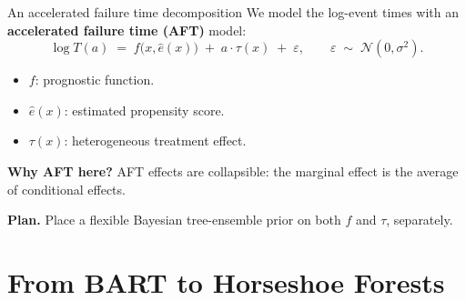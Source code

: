 \documentclass[10pt,aspectratio=169]{beamer}
\newcommand{\N}{\mathcal{N}}
\begin{document}
\begin{frame}{An accelerated failure time decomposition}
We model the log-event times with an \textbf{accelerated failure time (AFT)} model:
\[
\log T(a) \;=\; f\bigl(x, \hat e(x)\bigr) \;+\; a \cdot \tau(x) \;+\; \varepsilon, \qquad \varepsilon \;\sim\; \N(0, \sigma^2).
\]

\begin{itemize}
  \item $f$: prognostic function.
  \item $\hat e(x)$: estimated propensity score.
  \item $\tau(x)$: heterogeneous treatment effect.
\end{itemize}
\bigskip

\textbf{Why AFT here?} AFT effects are collapsible: the marginal effect is the average of conditional effects.

\bigskip
\textbf{Plan.} Place a flexible Bayesian tree-ensemble prior on both $f$ and $\tau$, separately.
\end{frame}

\section{From BART to Horseshoe Forests}
\end{document}
